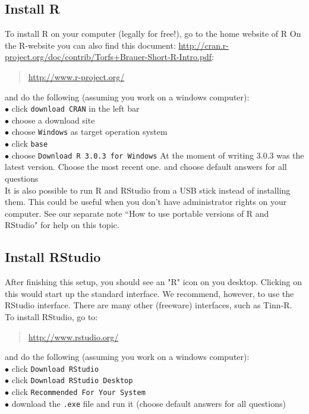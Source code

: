 \documentclass[a4paper,11pt,twocolumn,tablecaptionabove]{scrartcl}
\makeatletter
\let\SF@@footnote\footnote
\def\footnote{\ifx\protect\@typeset@protect
 \expandafter\SF@@footnote
 \else
 \expandafter\SF@gobble@opt
 \fi
}
\edef\SF@gobble@opt{\noexpand\protect
 \expandafter\noexpand\csname SF@gobble@opt \endcsname}
\makeatother
\begin{document}
\subsection{Install R}

To install R on your computer (legally for free!), go to the home
website of R\footnote{On the R-website you can also find this document: \url{http://cran.r-project.org/doc/contrib/Torfs+Brauer-Short-R-Intro.pdf}}:
\begin{quote}
  \url{http://www.r-project.org/}
\end{quote}
and do the following (assuming you work on a windows computer):\\
\noindent $\bullet$ click \texttt{download CRAN}  in the left bar\\
\noindent $\bullet$ choose a download site\\
\noindent $\bullet$ choose \texttt{Windows} as target operation system\\
\noindent $\bullet$ click \texttt{base}\\
\noindent $\bullet$ choose \texttt{Download R 3.0.3 for Windows} \footnote{At the moment of writing 3.0.3 was the latest version. Choose the most recent one.} and choose default answers for all questions\\

It is also possible to run R and RStudio from a USB stick instead of installing them. This could be useful when you don't have administrator rights on your computer. See our separate note ``How to use portable versions of R and RStudio" for help on this topic.

\subsection{Install RStudio}

After finishing this setup, you should see an "R" icon on you
desktop. Clicking on this would start up the standard interface.
We recommend, however, to use the RStudio interface.
\footnote{There are many other (freeware) interfaces, such as Tinn-R.}
To install RStudio, go to: 
\begin{quote}
  \url{http://www.rstudio.org/}
\end{quote}
and do the following (assuming you work on a windows computer):\\
\noindent $\bullet$ click \texttt{Download RStudio}\\
\noindent $\bullet$ click \texttt{Download RStudio Desktop}\\
\noindent $\bullet$ click \texttt{Recommended For Your System}\\
\noindent $\bullet$ download the \texttt{.exe} file and run it 
(choose default answers for all questions)
\end{document}

